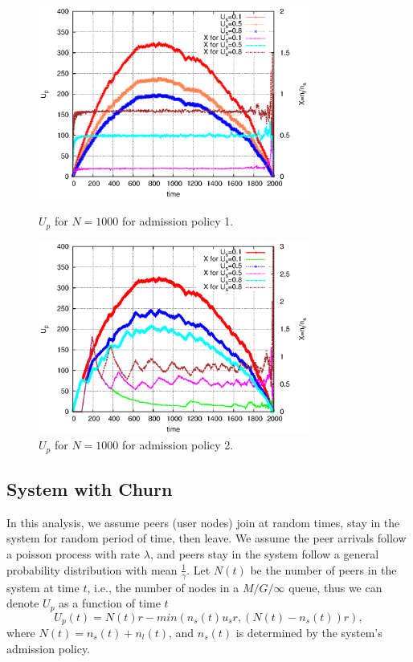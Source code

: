 \documentclass[paper]{ieice}
\begin{document}
\begin{figure}[thb]
\begin{minipage}[b]{0.4\linewidth}
\centering
\includegraphics[width=3.5in]{graphs/U_p_n_1000.eps}
\caption{$U_p$ for $N=1000$ for admission policy 1.}
\label{fig:U_p_1000_1}
\end{minipage}
\hspace{0.5cm}
\begin{minipage}[b]{0.68\linewidth}
\centering
\includegraphics[width=3.5in]{graphs/U_p_n_1000_admi.eps}
\caption{$U_p$ for $N=1000$ for admission policy 2.}
\label{fig:U_p_1000_2}
\end{minipage}
\end{figure}

\subsection{System with Churn}\label{sec:stablesystemwithchurn}

In this analysis, we assume peers (user nodes) join at random times, stay in the system for random period of time, then leave.
We assume the peer arrivals follow a poisson process with rate $\lambda$, and peers stay in the system follow a general probability distribution with mean $\frac{1}{\gamma}$.
Let $N(t)$ be the number of peers in the system at time $t$, i.e., the number of nodes in a $M/G/\infty$ queue, thus we can denote $U_p$ as a function of time $t$
\begin{equation}
        U_p(t) = N(t)r - min(n_s(t) u_s r, (N(t) - n_s(t))r),
\end{equation}
where $N(t) = n_s(t) + n_l(t)$, and $n_s(t)$ is determined by the system's admission policy.
\end{document}
